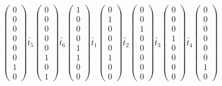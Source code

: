 \documentclass[12pt, paper=a4]{article}
\begin{document}
\begin{align*}
\begin{pmatrix} 0 \\ 0 \\ 0 \\ 0 \\ 0 \\ 0 \\ 1 \\ 0 \end{pmatrix} \underrightarrow{t_5}
\begin{pmatrix} 0 \\ 0 \\ 0 \\ 0 \\ 0 \\ 1 \\ 0 \\ 1 \end{pmatrix} \underrightarrow{t_6}
\begin{pmatrix} 1 \\ 0 \\ 0 \\ 0 \\ 1 \\ 1 \\ 0 \\ 0 \end{pmatrix} \underrightarrow{t_1}
\begin{pmatrix} 0 \\ 1 \\ 0 \\ 0 \\ 0 \\ 1 \\ 0 \\ 0 \end{pmatrix} \underrightarrow{t_2}
\begin{pmatrix} 0 \\ 0 \\ 1 \\ 0 \\ 0 \\ 0 \\ 0 \\ 0 \end{pmatrix} \underrightarrow{t_3}
\begin{pmatrix} 0 \\ 0 \\ 0 \\ 1 \\ 0 \\ 0 \\ 0 \\ 0 \end{pmatrix} \underrightarrow{t_4}
\begin{pmatrix} 0 \\ 0 \\ 0 \\ 0 \\ 0 \\ 0 \\ 1 \\ 0 \end{pmatrix}
\end{align*}
\end{document}
